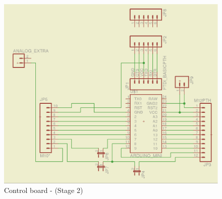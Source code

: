 \documentclass[12pt,a4paper]{report}
\begin{document}
\begin{figure}[H]
\centering
\includegraphics*[scale=0.25]{control_brd_s2}
\caption{Control board -  (Stage 2)}
\label{Control-brd-s2}
\end{figure}
\ \\
\end{document}
